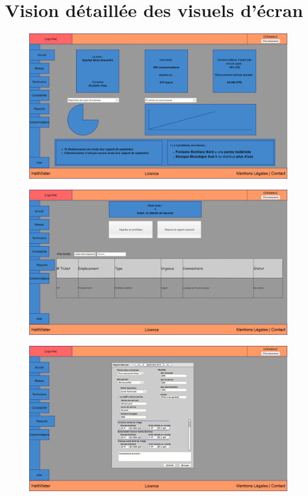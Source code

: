 \documentclass[a4paper, 11pt]{article}
\begin{document}
\newpage

\appendix
\section{Vision détaillée des visuels d'écran \label{annexe}}
  \filbreak
  \begin{figure}[H] %
    \centering
    \includegraphics[scale=0.32, angle=90]{Cahier_des_Charges/accueil}
  \end{figure}

  \begin{figure}
    \centering
    \includegraphics[width=\textwidth]{Cahier_des_Charges/rapports}
  \end{figure}

  \begin{figure}
    \centering
    \includegraphics[width=\textwidth]{Cahier_des_Charges/rapports_mensuel}
  \end{figure}
\end{document}
